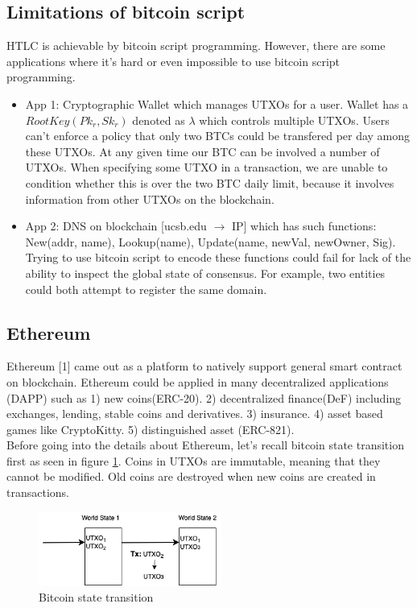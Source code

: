 \documentclass[twoside]{article}
\renewcommand{\cite}[1]{[#1]}
\begin{document}
\subsection{Limitations of bitcoin script}
HTLC is achievable by bitcoin script programming. However, there are some applications where it's hard or even impossible to use bitcoin script programming.
\begin{itemize}
\item App 1: Cryptographic Wallet which manages UTXOs for a user. Wallet has a $RootKey(Pk_r, Sk_r)$ denoted as $\lambda$ which controls multiple UTXOs. Users can't enforce a policy that only two BTCs could be transfered per day among these UTXOs. At any given time our BTC can be involved a number of UTXOs. When specifying some UTXO in a transaction, we are unable to condition whether this is over the two BTC daily limit, because it involves information from other UTXOs on the blockchain.
\item App 2: DNS on blockchain [ucsb.edu $\rightarrow$ IP] which has such functions: New(addr, name), Lookup(name), Update(name, newVal, newOwner, Sig). Trying to use bitcoin script to encode these functions could fail for lack of the ability to inspect the global state of consensus. For example, two entities could both attempt to register the same domain.
\end{itemize}
\subsection{Ethereum}
Ethereum \cite{1} came out as a platform to natively support general smart contract on blockchain. Ethereum could be applied in many decentralized applications (DAPP) such as 1) new coins(ERC-20). 2) decentralized finance(DeF) including exchanges, lending, stable coins and derivatives. 3) insurance. 4) asset based games like CryptoKitty. 5) distinguished asset (ERC-821).\\
Before going into the details about Ethereum, let's recall bitcoin state transition first as seen in figure \ref{fig Bitcoin state transition}. Coins in UTXOs are immutable, meaning that they cannot be modified. Old coins are destroyed when new coins are created in transactions.
\begin{figure}[h]
\centering
\includegraphics[width=6cm]{fig_1.png}
\caption{Bitcoin state transition}
\label{fig Bitcoin state transition}
\end{figure}
\end{document}
